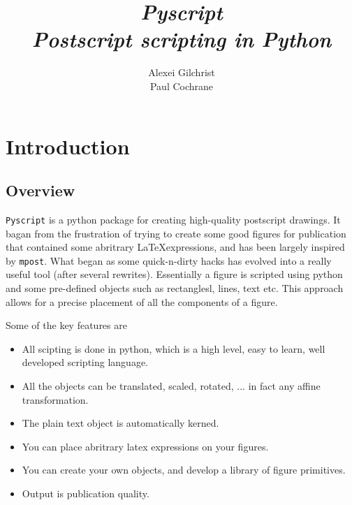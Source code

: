\documentclass[a4paper]{book}
\begin{document}
\title{{\Huge \emph{Pyscript}}\\[1cm]
\emph{Postscript scripting in Python}\\[3cm]}

\author{Alexei Gilchrist\\
Paul Cochrane\\[3cm]}


\maketitle

\tableofcontents

\chapter{Introduction}
\label{cha:introduction}


\section{Overview}

\Verb|Pyscript| is a python package for creating high-quality postscript drawings.
It bagan from the frustration of trying to create some good figures for publication
that contained some abritrary \LaTeX expressions, and has been largely inspired
by \Verb|mpost|. What began as some quick-n-dirty hacks has evolved into a really 
useful tool (after several rewrites). Essentially a figure is scripted using python
and some pre-defined objects such as rectanglesl, lines, text etc. This approach
allows for a precise placement of all the components of a figure.

Some of the key features are
\begin{itemize}
\item All scipting is done in python, which is a high level, easy to
  learn, well developed scripting language.
\item All the objects can be translated, scaled, rotated, ... in fact any affine transformation.
\item The plain text object is automatically kerned.
\item You can place abritrary latex expressions on your figures.
\item You can create your own objects, and develop a library of
  figure primitives. 
\item Output is publication quality.
\end{itemize}
\end{document}
